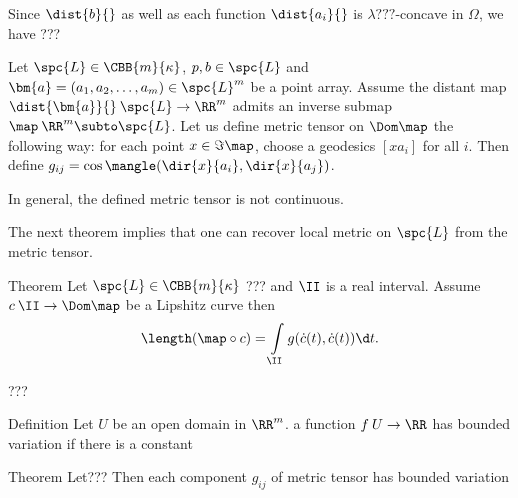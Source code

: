 {Since $\dist{b}{}$ 
as well as each function $\dist{a_i}{}$ is $\lambda???$-concave in $\Omega$,
we have ???
\qeds



















Let $\spc{L}\in\CBB{m}{\kappa}$,
$p,b\in\spc{L}$ 
and $\bm{a}=(a_1,a_2,\dots,a_m)\in\spc{L}^{m}$ be a point array.
Assume the distant map $\dist{\bm{a}}{}\:\spc{L}\to\RR^m$ admits an inverse submap $\map\:\RR^m\subto \spc{L}$.
Let us define metric tensor on $\Dom\map$ the following way:
for each point $x\in \Im\map$, choose a geodesics $[xa_i]$ for all $i$.
Then define $g_{ij}=\cos\mangle(\dir{x}{a_i},\dir{x}{a_j})$.

In general, the defined metric tensor is not continuous.

The next theorem implies that one can recover local metric on $\spc{L}$ from the metric tensor.

\begin{thm}{Theorem}
Let $\spc{L}\in\CBB{m}{\kappa}$ ???
and $\II$ is a real interval.
Assume $c\:\II\to\Dom\map$ be a Lipshitz curve then
$$\length(\map\circ c)=\int\limits_\II g(\dot c(t),\dot c(t))\d t.$$
\end{thm}

???
\qeds

\begin{thm}{Definition}
Let $U$ be an open domain in $\RR^m$.
a function $f\:U\to\RR$ has bounded variation if there is a constant 
\end{thm}


\begin{thm}{Theorem}
Let???
Then each component $g_{ij}$ of metric tensor has bounded variation
\end{thm}



















}
